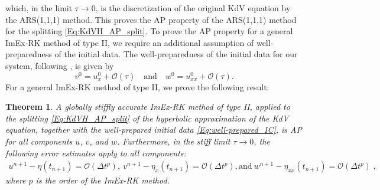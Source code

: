 \documentclass{article}
\newcommand{\ukdv}{\eta}
\newtheorem{thm}{Theorem}
\begin{document}
which, in the limit $\tau \to 0$, is the discretization of the original KdV equation by the ARS(1,1,1) method. This proves the AP property of the ARS(1,1,1) method for the splitting \eqref{Eq:KdVH_AP_split}. To prove the AP property for a general ImEx-RK method of type II, we require an additional assumption of well-preparedness of the initial data. The well-preparedness of the initial data for our system, following \cite{boscarino2024asymptotic}, is given by
\begin{equation}\label{Eq:well-prepared_IC}
    v^{0} = u^{0}_x +  \mathcal{O}(\tau) \quad \text{and} \quad w^{0} = u^{0}_{xx} +  \mathcal{O}(\tau).
\end{equation}
For a general ImEx-RK method of type II, we prove the following result:
\begin{thm}\label{Th:AP_result_type_II}
    A globally stiffly accurate ImEx-RK method of type II, applied to the splitting \eqref{Eq:KdVH_AP_split} of the hyperbolic
    approximation of the KdV equation, together with the well-prepared initial data \eqref{Eq:well-prepared_IC}, is AP for all
    components $u$, $v$, and $w$. Furthermore, in the stiff limit $\tau \to 0$, the following error estimates apply to all
    components:
    \begin{align*}
        u^{n+1} - \ukdv(t_{n+1}) = \mathcal{O}(\Delta t^p), \ v^{n+1} - \ukdv_{x}(t_{n+1}) = \mathcal{O}(\Delta t^p),
        \textrm{and} \ w^{n+1} - \ukdv_{xx}(t_{n+1}) = \mathcal{O}(\Delta t^p)\;,
    \end{align*}
    where $p$ is the order of the ImEx-RK method.
\end{thm}
\end{document}
